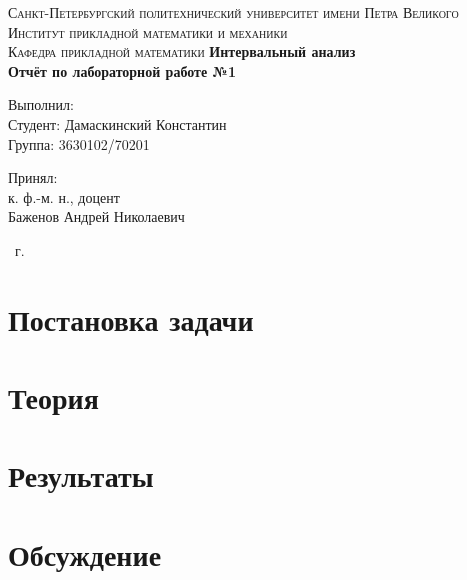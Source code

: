 \documentclass[14pt,a4paper,article]{ncc}
\numberwithin{equation}{subsection}
\begin{document}
\begin{titlepage}
    \begin{center}
        \textsc{
            Санкт-Петербургский политехнический университет имени Петра Великого \\[5mm]
            Институт прикладной математики и механики\\[2mm]
            Кафедра прикладной математики
        }   
        \vfill
        \textbf{\large
            Интервальный анализ\\
            Отчёт по лабораторной работе №1 \\[3mm]
        }                
    \end{center}

    \vfill
    \hfill
    \begin{minipage}{0.5\textwidth}
        Выполнил: \\[2mm]   
		Студент: Дамаскинский Константин \\
		Группа: 3630102/70201\\
    \end{minipage}

	\hfill
	\begin{minipage}{0.5\textwidth}
		Принял: \\[2mm]
		к. ф.-м. н., доцент \\   
		Баженов Андрей Николаевич
	\end{minipage}

    \vfill
    \begin{center}
        \theyear\ г.
    \end{center}
\end{titlepage}

\tableofcontents
\listoffigures
\listoftables
\newpage

\section{Постановка задачи}
%


\section{Теория}




\section{Результаты}


\section{Обсуждение}



\printbibliography
{}


\end{document}
